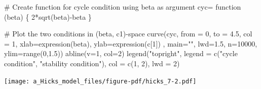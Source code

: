 \documentclass[
  letterpaper,
  DIV=11,
  numbers=noendperiod]{scrreprt}
\newenvironment{Shaded}{\begin{snugshade}}{\end{snugshade}}
\newcommand{\AttributeTok}[1]{\textcolor[rgb]{0.40,0.45,0.13}{#1}}
\newcommand{\CommentTok}[1]{\textcolor[rgb]{0.37,0.37,0.37}{#1}}
\newcommand{\ControlFlowTok}[1]{\textcolor[rgb]{0.00,0.23,0.31}{#1}}
\newcommand{\DecValTok}[1]{\textcolor[rgb]{0.68,0.00,0.00}{#1}}
\newcommand{\FloatTok}[1]{\textcolor[rgb]{0.68,0.00,0.00}{#1}}
\newcommand{\FunctionTok}[1]{\textcolor[rgb]{0.28,0.35,0.67}{#1}}
\newcommand{\NormalTok}[1]{\textcolor[rgb]{0.00,0.23,0.31}{#1}}
\newcommand{\OtherTok}[1]{\textcolor[rgb]{0.00,0.23,0.31}{#1}}
\newcommand{\SpecialCharTok}[1]{\textcolor[rgb]{0.37,0.37,0.37}{#1}}
\newcommand{\StringTok}[1]{\textcolor[rgb]{0.13,0.47,0.30}{#1}}
\begin{document}
\begin{Shaded}
\begin{Highlighting}[]
\CommentTok{\# Create function for cycle condition using beta as argument}
\NormalTok{cyc}\OtherTok{=} \ControlFlowTok{function}\NormalTok{ (beta) \{}
  \DecValTok{2}\SpecialCharTok{*}\FunctionTok{sqrt}\NormalTok{(beta)}\SpecialCharTok{{-}}\NormalTok{beta}
\NormalTok{\}}

\CommentTok{\# Plot the two conditions in (beta, c1){-}space}
\FunctionTok{curve}\NormalTok{(cyc, }\AttributeTok{from =} \DecValTok{0}\NormalTok{, }\AttributeTok{to =} \FloatTok{4.5}\NormalTok{, }\AttributeTok{col =} \DecValTok{1}\NormalTok{, }\AttributeTok{xlab=}\FunctionTok{expression}\NormalTok{(beta), }\AttributeTok{ylab=}\FunctionTok{expression}\NormalTok{(c[}\DecValTok{1}\NormalTok{]) , }\AttributeTok{main=}\StringTok{""}\NormalTok{,}
      \AttributeTok{lwd=}\FloatTok{1.5}\NormalTok{, }\AttributeTok{n=}\DecValTok{10000}\NormalTok{, }\AttributeTok{ylim=}\FunctionTok{range}\NormalTok{(}\DecValTok{0}\NormalTok{,}\FloatTok{1.5}\NormalTok{))}
\FunctionTok{abline}\NormalTok{(}\AttributeTok{v=}\DecValTok{1}\NormalTok{, }\AttributeTok{col=}\DecValTok{2}\NormalTok{)}
\FunctionTok{legend}\NormalTok{(}\StringTok{"topright"}\NormalTok{, }\AttributeTok{legend =} \FunctionTok{c}\NormalTok{(}\StringTok{"cycle condition"}\NormalTok{, }\StringTok{"stability condition"}\NormalTok{), }
       \AttributeTok{col =} \FunctionTok{c}\NormalTok{(}\DecValTok{1}\NormalTok{, }\DecValTok{2}\NormalTok{), }\AttributeTok{lwd =} \DecValTok{2}\NormalTok{)}
\end{Highlighting}
\end{Shaded}

\texttt{[image: a\_Hicks\_model\_files/figure-pdf/hicks\_7-2.pdf]}
\end{document}
